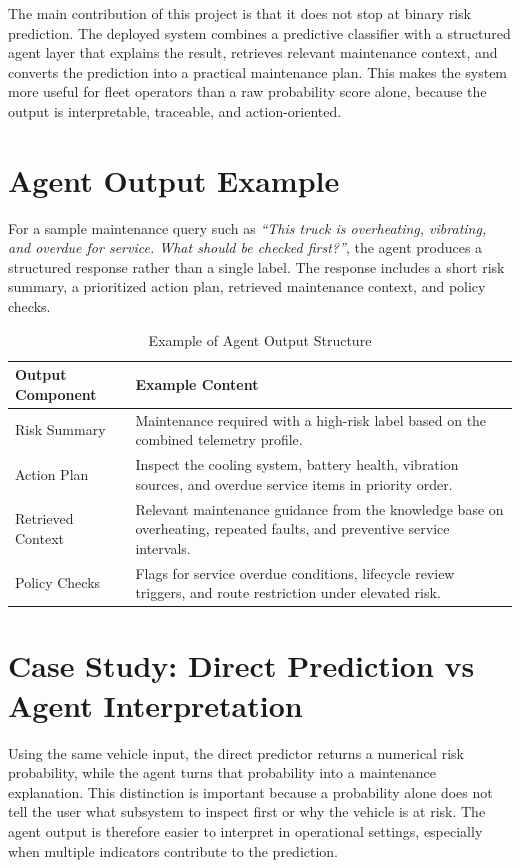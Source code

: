 \documentclass[12pt, a4paper]{article}
\begin{document}
The main contribution of this project is that it does not stop at binary risk prediction. The deployed system combines a predictive classifier with a structured agent layer that explains the result, retrieves relevant maintenance context, and converts the prediction into a practical maintenance plan. This makes the system more useful for fleet operators than a raw probability score alone, because the output is interpretable, traceable, and action-oriented.

\section{Agent Output Example}

For a sample maintenance query such as \textit{``This truck is overheating, vibrating, and overdue for service. What should be checked first?''}, the agent produces a structured response rather than a single label. The response includes a short risk summary, a prioritized action plan, retrieved maintenance context, and policy checks.

\begin{table}[H]
\centering
\caption{Example of Agent Output Structure}
\begin{tabularx}{\textwidth}{p{3.5cm}X}
\toprule
\textbf{Output Component} & \textbf{Example Content} \\
\midrule
Risk Summary & Maintenance required with a high-risk label based on the combined telemetry profile. \\
Action Plan & Inspect the cooling system, battery health, vibration sources, and overdue service items in priority order. \\
Retrieved Context & Relevant maintenance guidance from the knowledge base on overheating, repeated faults, and preventive service intervals. \\
Policy Checks & Flags for service overdue conditions, lifecycle review triggers, and route restriction under elevated risk. \\
\bottomrule
\end{tabularx}
\end{table}

\section{Case Study: Direct Prediction vs Agent Interpretation}

Using the same vehicle input, the direct predictor returns a numerical risk probability, while the agent turns that probability into a maintenance explanation. This distinction is important because a probability alone does not tell the user what subsystem to inspect first or why the vehicle is at risk. The agent output is therefore easier to interpret in operational settings, especially when multiple indicators contribute to the prediction.
\end{document}
